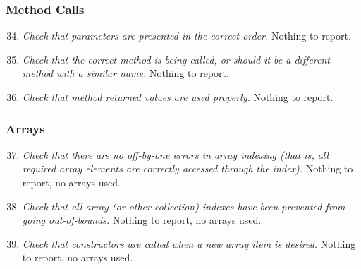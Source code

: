	\subsubsection{Method Calls}
		\begin{enumerate}
			\setcounter{enumi}{33}
			\item \textit{Check that parameters are presented in the correct order.}\newline
			Nothing to report. %

			\item \textit{Check that the correct method is being called, or should it be a different method with a similar name.}\newline
			Nothing to report. %

			\item \textit{Check that method returned values are used properly.}\newline
			Nothing to report. %

		\end{enumerate}

	\subsubsection{Arrays}
		\begin{enumerate}
			\setcounter{enumi}{36}
			\item \textit{Check that there are no off-by-one errors in array indexing (that is, all required array elements are correctly accessed through the index).}\newline
			Nothing to report, no arrays used. %

			\item \textit{Check that all array (or other collection) indexes have been prevented from going out-of-bounds.}\newline
			Nothing to report, no arrays used. %

			\item \textit{Check that constructors are called when a new array item is desired.}\newline
			Nothing to report, no arrays used. %

		\end{enumerate}

